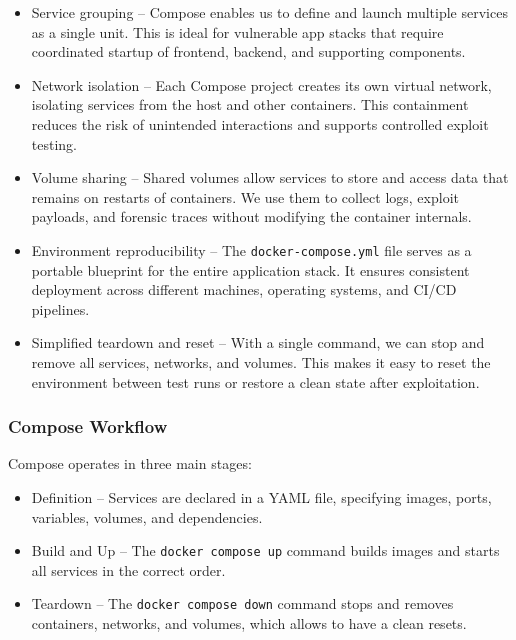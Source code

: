 \documentclass[12pt]{article}
\begin{document}
\begin{itemize}
    \item{Service grouping} – Compose enables us to define and launch multiple services as a single unit. This is ideal for vulnerable app stacks that require coordinated startup of frontend, backend, and supporting components.
    
    \item{Network isolation} – Each Compose project creates its own virtual network, isolating services from the host and other containers. This containment reduces the risk of unintended interactions and supports controlled exploit testing.
    
    \item{Volume sharing} – Shared volumes allow services to store and access data that remains on restarts of containers. We use them to collect logs, exploit payloads, and forensic traces without modifying the container internals.
    
    \item{Environment reproducibility} – The \texttt{docker-compose.yml} file serves as a portable blueprint for the entire application stack. It ensures consistent deployment across different machines, operating systems, and CI/CD pipelines.
    
    \item{Simplified teardown and reset} – With a single command, we can stop and remove all services, networks, and volumes. This makes it easy to reset the environment between test runs or restore a clean state after exploitation.
\end{itemize}

\subsubsection{Compose Workflow}
Compose operates in three main stages:
\begin{itemize}
    \item{Definition} – Services are declared in a YAML file, specifying images, ports, variables, volumes, and dependencies.
    \item{Build and Up} – The \texttt{docker compose up} command builds images and starts all services in the correct order.
    \item{Teardown} – The \texttt{docker compose down} command stops and removes containers, networks, and volumes, which allows to have a clean resets.
\end{itemize}
\end{document}
